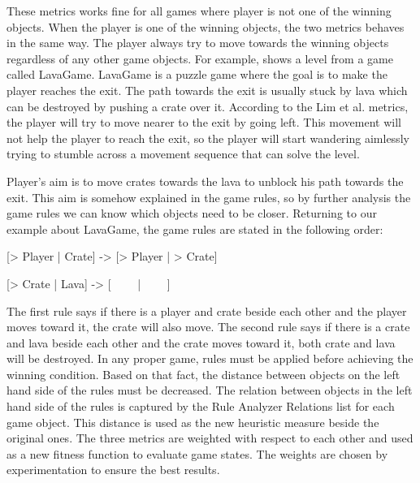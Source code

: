 \begin{hcfigure}
\begin{minipage}{0.45\textwidth}
  		\caption{Example of distance between player and winning objects metric}
  		\label{Figure:bestFS2}
	\end{minipage}
\end{hcfigure}

These metrics works fine for all games where player is not one of the winning objects. When the player is one of the winning objects, the two metrics behaves in the same way. The player always try to move towards the winning objects regardless of any other game objects. For example,  shows a level from a game called LavaGame. LavaGame is a puzzle game where the goal is to make the player reaches the exit. The path towards the exit is usually stuck by lava which can be destroyed by pushing a crate over it. According to the Lim et al. metrics, the player will try to move nearer to the exit by going left. This movement will not help the player to reach the exit, so the player will start wandering aimlessly trying to stumble across a movement sequence that can solve the level.


Player's aim is to move crates towards the lava to unblock his path towards the exit. This aim is somehow explained in the game rules, so by further analysis the game rules we can know which objects need to be closer. Returning to our example about LavaGame, the game rules are stated in the following order:
\begin{center}{[> Player | Crate] -> [> Player | > Crate]}\end{center}
\begin{center}{[> Crate | Lava] -> [ \ \ \ \ | \ \ \ \ ]}\end{center}
The first rule says if there is a player and crate beside each other and the player moves toward it, the crate will also move. The second rule says if there is a crate and lava beside each other and the crate moves toward it, both crate and lava will be destroyed. In any proper game, rules must be applied before achieving the winning condition. Based on that fact, the distance between objects on the left hand side of the rules must be decreased. The relation between objects in the left hand side of the rules is captured by the Rule Analyzer Relations list for each game object. This distance is used as the new heuristic measure beside the original ones. The three metrics are weighted with respect to each other and used as a new fitness function to evaluate game states. The weights are chosen by experimentation to ensure the best results.\\\par

